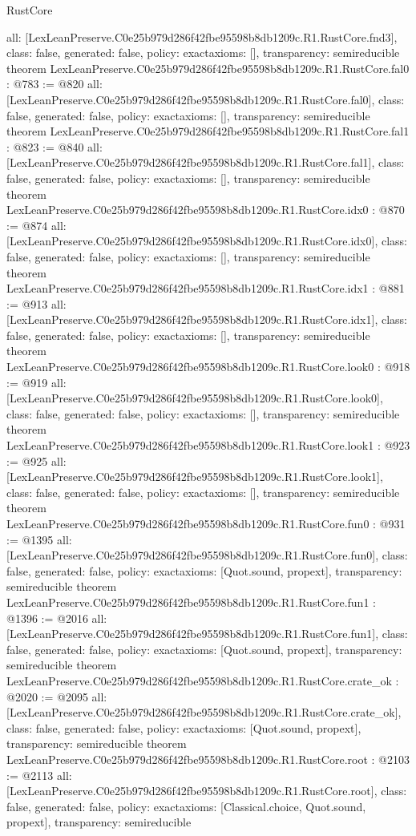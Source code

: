 \begin{lexlean}{RustCore}
\begin{coremodule}
{  all: [LexLeanPreserve.C0e25b979d286f42fbe95598b8db1209c.R1.RustCore.fnd3],
  class: false,
  generated: false,
  policy: exact{axioms: []},
  transparency: semireducible
}
theorem LexLeanPreserve.C0e25b979d286f42fbe95598b8db1209c.R1.RustCore.fal0 : @783 := @820 {
  all: [LexLeanPreserve.C0e25b979d286f42fbe95598b8db1209c.R1.RustCore.fal0],
  class: false,
  generated: false,
  policy: exact{axioms: []},
  transparency: semireducible
}
theorem LexLeanPreserve.C0e25b979d286f42fbe95598b8db1209c.R1.RustCore.fal1 : @823 := @840 {
  all: [LexLeanPreserve.C0e25b979d286f42fbe95598b8db1209c.R1.RustCore.fal1],
  class: false,
  generated: false,
  policy: exact{axioms: []},
  transparency: semireducible
}
theorem LexLeanPreserve.C0e25b979d286f42fbe95598b8db1209c.R1.RustCore.idx0 : @870 := @874 {
  all: [LexLeanPreserve.C0e25b979d286f42fbe95598b8db1209c.R1.RustCore.idx0],
  class: false,
  generated: false,
  policy: exact{axioms: []},
  transparency: semireducible
}
theorem LexLeanPreserve.C0e25b979d286f42fbe95598b8db1209c.R1.RustCore.idx1 : @881 := @913 {
  all: [LexLeanPreserve.C0e25b979d286f42fbe95598b8db1209c.R1.RustCore.idx1],
  class: false,
  generated: false,
  policy: exact{axioms: []},
  transparency: semireducible
}
theorem LexLeanPreserve.C0e25b979d286f42fbe95598b8db1209c.R1.RustCore.look0 : @918 := @919 {
  all: [LexLeanPreserve.C0e25b979d286f42fbe95598b8db1209c.R1.RustCore.look0],
  class: false,
  generated: false,
  policy: exact{axioms: []},
  transparency: semireducible
}
theorem LexLeanPreserve.C0e25b979d286f42fbe95598b8db1209c.R1.RustCore.look1 : @923 := @925 {
  all: [LexLeanPreserve.C0e25b979d286f42fbe95598b8db1209c.R1.RustCore.look1],
  class: false,
  generated: false,
  policy: exact{axioms: []},
  transparency: semireducible
}
theorem LexLeanPreserve.C0e25b979d286f42fbe95598b8db1209c.R1.RustCore.fun0 : @931 := @1395 {
  all: [LexLeanPreserve.C0e25b979d286f42fbe95598b8db1209c.R1.RustCore.fun0],
  class: false,
  generated: false,
  policy: exact{axioms: [Quot.sound, propext]},
  transparency: semireducible
}
theorem LexLeanPreserve.C0e25b979d286f42fbe95598b8db1209c.R1.RustCore.fun1 : @1396 := @2016 {
  all: [LexLeanPreserve.C0e25b979d286f42fbe95598b8db1209c.R1.RustCore.fun1],
  class: false,
  generated: false,
  policy: exact{axioms: [Quot.sound, propext]},
  transparency: semireducible
}
theorem LexLeanPreserve.C0e25b979d286f42fbe95598b8db1209c.R1.RustCore.crate_ok : @2020 := @2095 {
  all: [LexLeanPreserve.C0e25b979d286f42fbe95598b8db1209c.R1.RustCore.crate_ok],
  class: false,
  generated: false,
  policy: exact{axioms: [Quot.sound, propext]},
  transparency: semireducible
}
theorem LexLeanPreserve.C0e25b979d286f42fbe95598b8db1209c.R1.RustCore.root : @2103 := @2113 {
  all: [LexLeanPreserve.C0e25b979d286f42fbe95598b8db1209c.R1.RustCore.root],
  class: false,
  generated: false,
  policy: exact{axioms: [Classical.choice, Quot.sound, propext]},
  transparency: semireducible
}


\end{coremodule}
\end{lexlean}
